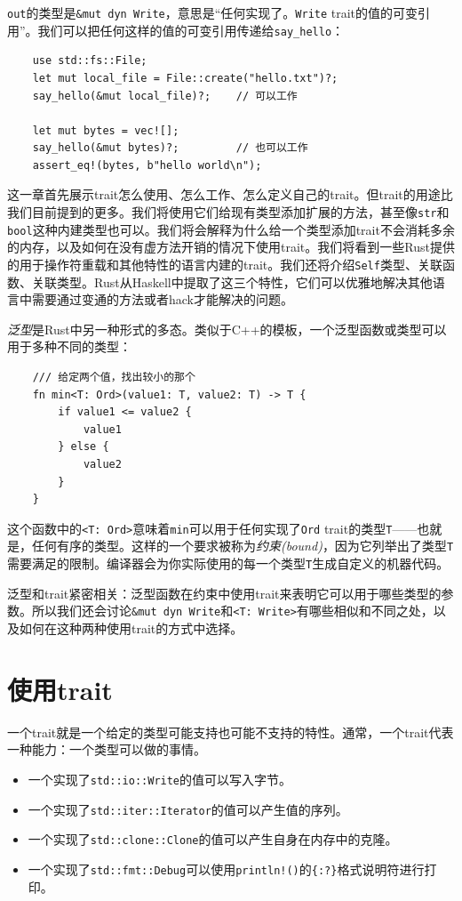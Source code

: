 \texttt{out}的类型是\texttt{\&mut dyn Write}，意思是“任何实现了。\texttt{Write} trait的值的可变引用”。我们可以把任何这样的值的可变引用传递给\texttt{say\_hello}：
\begin{verbatim}
    use std::fs::File;
    let mut local_file = File::create("hello.txt")?;
    say_hello(&mut local_file)?;    // 可以工作

    let mut bytes = vec![];
    say_hello(&mut bytes)?;         // 也可以工作
    assert_eq!(bytes, b"hello world\n");
\end{verbatim}

这一章首先展示trait怎么使用、怎么工作、怎么定义自己的trait。但trait的用途比我们目前提到的更多。我们将使用它们给现有类型添加扩展的方法，甚至像\texttt{str}和\texttt{bool}这种内建类型也可以。我们将会解释为什么给一个类型添加trait不会消耗多余的内存，以及如何在没有虚方法开销的情况下使用trait。我们将看到一些Rust提供的用于操作符重载和其他特性的语言内建的trait。我们还将介绍\texttt{Self}类型、关联函数、关联类型。Rust从Haskell中提取了这三个特性，它们可以优雅地解决其他语言中需要通过变通的方法或者hack才能解决的问题。 

\emph{泛型}是Rust中另一种形式的多态。类似于C++的模板，一个泛型函数或类型可以用于多种不同的类型：
\begin{verbatim}
    /// 给定两个值，找出较小的那个
    fn min<T: Ord>(value1: T, value2: T) -> T {
        if value1 <= value2 {
            value1
        } else {
            value2
        }
    }
\end{verbatim}

这个函数中的\texttt{<T: Ord>}意味着\texttt{min}可以用于任何实现了\texttt{Ord} trait的类型\texttt{T}——也就是，任何有序的类型。这样的一个要求被称为\emph{约束(bound)}，因为它列举出了类型\texttt{T}需要满足的限制。编译器会为你实际使用的每一个类型\texttt{T}生成自定义的机器代码。

泛型和trait紧密相关：泛型函数在约束中使用trait来表明它可以用于哪些类型的参数。所以我们还会讨论\texttt{\&mut dyn Write}和\texttt{<T: Write>}有哪些相似和不同之处，以及如何在这种两种使用trait的方式中选择。

\section{使用trait}

一个trait就是一个给定的类型可能支持也可能不支持的特性。通常，一个trait代表一种能力：一个类型可以做的事情。
\begin{itemize}
    \item 一个实现了\texttt{std::io::Write}的值可以写入字节。
    \item 一个实现了\texttt{std::iter::Iterator}的值可以产生值的序列。
    \item 一个实现了\texttt{std::clone::Clone}的值可以产生自身在内存中的克隆。
    \item 一个实现了\texttt{std::fmt::Debug}可以使用\texttt{println!()}的\texttt{\{:?\}}格式说明符进行打印。
\end{itemize}

